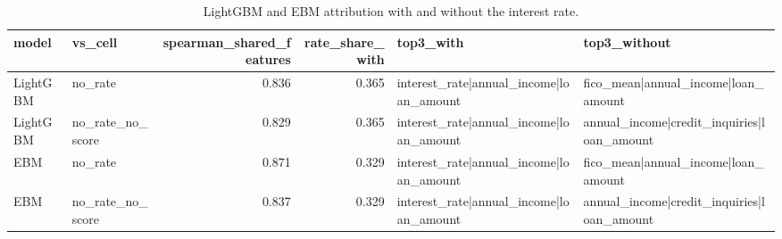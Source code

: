 \begin{table}[t]
\centering
\caption{LightGBM and EBM attribution with and without the interest rate.}
\label{tab:T9c_shap_rate}
\small
\begin{tabular}{llrrll}
\toprule
model & vs\_cell & spearman\_shared\_features & rate\_share\_with & top3\_with & top3\_without \\
\midrule
LightGBM & no\_rate & 0.836 & 0.365 & interest\_rate|annual\_income|loan\_amount & fico\_mean|annual\_income|loan\_amount \\
LightGBM & no\_rate\_no\_score & 0.829 & 0.365 & interest\_rate|annual\_income|loan\_amount & annual\_income|credit\_inquiries|loan\_amount \\
EBM & no\_rate & 0.871 & 0.329 & interest\_rate|annual\_income|loan\_amount & fico\_mean|annual\_income|loan\_amount \\
EBM & no\_rate\_no\_score & 0.837 & 0.329 & interest\_rate|annual\_income|loan\_amount & annual\_income|credit\_inquiries|loan\_amount \\
\bottomrule
\end{tabular}
\end{table}
